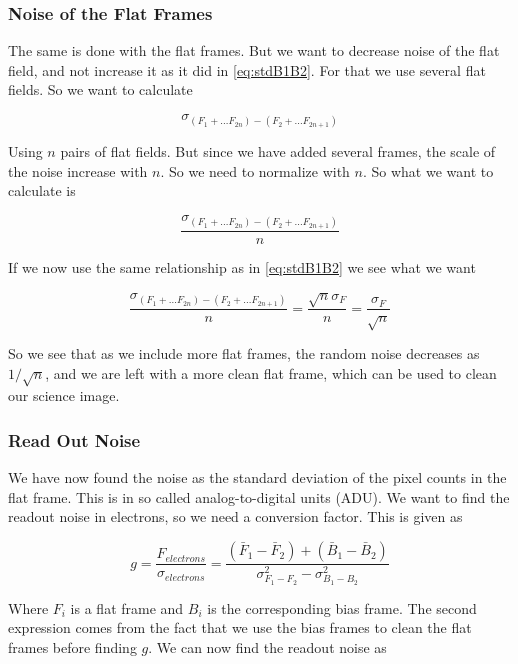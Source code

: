 \documentclass{emulateapj}
\begin{document}
\subsubsection{Noise of the Flat Frames}
\label{sec:noiseFlat}
The same is done with the flat frames. But we want to decrease noise of the flat field, and not increase it as it did in \eqref{eq:stdB1B2}. For that we use several flat fields. So we want to calculate

\begin{equation}
\sigma_{(F_1 + \ldots F_{2n})- (F_2 + \ldots F_{2n+1})}
\end{equation}

Using $n$ pairs of flat fields. But since we have added several frames, the scale of the noise increase with $n$. So we need to normalize with $n$. So what we want to calculate is

\begin{equation}
\frac{\sigma_{(F_1 + \ldots F_{2n})- (F_2 + \ldots F_{2n+1})}}{n}
\end{equation}

If we now use the same relationship as in \eqref{eq:stdB1B2} we see what we want

\begin{equation}
\frac{\sigma_{(F_1 + \ldots F_{2n})- (F_2 + \ldots F_{2n+1})}}{n} = \frac{\sqrt{n}\sigma_F}{n} = \frac{\sigma_F}{\sqrt{n}}
\end{equation}

So we see that as we include more flat frames, the random noise decreases as $1/\sqrt{n}$, and we are left with a more clean flat frame, which can be used to clean our science image.

\subsubsection{Read Out Noise}

We have now found the noise as the standard deviation of the pixel counts in the flat frame. This is in so called analog-to-digital units (ADU). We want to find the readout noise in electrons, so we need a conversion factor. This is given as

\begin{equation}
g = \frac{F_{electrons}}{\sigma_{electrons}} = \frac{(\bar{F}_1 - \bar{F}_2) + (\bar{B}_1-\bar{B}_2)}{\sigma_{F_1 - F_2}^2 - \sigma_{B_1 - B_2}^2}
\label{eq:g}
\end{equation}

Where $F_i$ is a flat frame and $B_i$ is the corresponding bias frame. The second expression comes from the fact that we use the bias frames to clean the flat frames before finding $g$. We can now find the readout noise as
\end{document}
